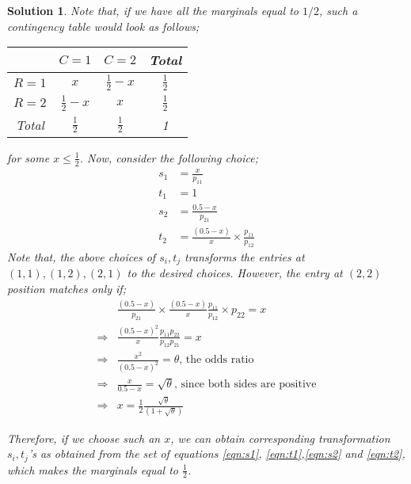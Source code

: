 \documentclass[12pt]{article}
\theoremstyle{problemstyle}
\newtheorem{solution}{Solution}
\begin{document}
\begin{solution}
 	Note that, if we have all the marginals equal to $1/2$, such a contingency table would look as follows;
 	\begin{table}[H]
 		\centering 
 		\begin{tabular}{cccc}
 			\toprule
 			 & $C=1$ & $C=2$ & Total\\
 			\midrule 
 			$R = 1$ & $x$ & $\frac{1}{2} - x$ & $\frac{1}{2}$\\
 			$R=2$ & $\frac{1}{2} - x$ & $x$ & $\frac{1}{2}$\\
 			\midrule
 			Total & $\frac{1}{2}$ & $\frac{1}{2}$ & 1\\
 			\bottomrule
 		\end{tabular}	
 	\end{table}
 	for some $x \leq \frac{1}{2}$. Now, consider the following choice;
 	\begin{align}
 		\label{eqn:s1}
 		s_1 & = \frac{x}{p_{11}}\\
 		\label{eqn:t1}
 		t_1 & = 1\\
 		\label{eqn:s2}
 		s_2 & = \frac{0.5 - x}{p_{21}}\\
 		\label{eqn:t2}
 		t_2 & = \frac{(0.5-x)}{x} \times \frac{p_{11}}{p_{12}}
 	\end{align}
 	Note that, the above choices of $s_i, t_j$ transforms the entries at $(1,1), (1,2), (2,1)$ to the desired choices. However, the entry at $(2,2)$ position matches only if;
 	\begin{align*}
 		& \frac{(0.5 - x)}{p_{21}}\times \frac{(0.5-x)}{x}\frac{p_{11}}{p_{12}}\times p_{22} = x\\
 		\Rightarrow & \frac{(0.5 - x)^2}{x} \frac{p_{11}p_{22}}{p_{12}p_{21}} = x\\
 		\Rightarrow & \frac{x^2}{(0.5-x)^2} = \theta \text{, the odds ratio}\\
 		\Rightarrow & \frac{x}{0.5 -x} = \sqrt{\theta} \text{, since both sides are positive}\\
 		\Rightarrow & x = \frac{1}{2}\frac{\sqrt{\theta}}{(1 + \sqrt{\theta})}	
 	\end{align*}
 	
 	Therefore, if we choose such an $x$, we can obtain corresponding transformation $s_i, t_j$'s as obtained from the set of equations \ref{eqn:s1}, \ref{eqn:t1},\ref{eqn:s2} and \ref{eqn:t2}, which makes the marginals equal to $\frac{1}{2}$.
 	

\end{solution}
\end{document}

